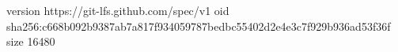 version https://git-lfs.github.com/spec/v1
oid sha256:c668b092b9387ab7a817f934059787bedbc55402d2e4e3c7f929b936ad53f36f
size 16480
